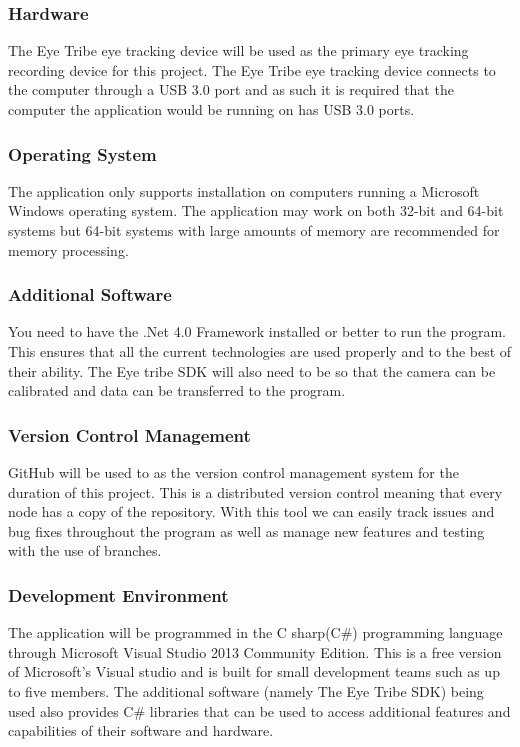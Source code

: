\subsubsection{Hardware}
The Eye Tribe eye tracking device will be used as the primary eye tracking recording device for this project. The Eye Tribe eye tracking device connects to the computer through a USB 3.0 port and as such it is required that the computer the application would be running on has USB 3.0 ports.

\subsubsection{Operating System}
The application only supports installation on computers running a Microsoft Windows operating system. The application may work on both 32-bit and 64-bit systems but 64-bit systems with large amounts of memory are recommended for memory processing. 

\subsubsection{Additional Software}
You need to have the .Net 4.0 Framework installed or better to run the program. This ensures that all the current technologies are used properly and to the best of their ability. The Eye tribe SDK will also need to be so that the camera can be calibrated and data can be transferred to the program.

\subsubsection{Version Control Management}
GitHub will be used to as the version control management system for the duration of this project.
This is a distributed version control meaning that every node has a copy of the repository. With this tool we can easily track issues and bug fixes throughout the program as well as manage new features and testing with the use of branches.

\subsubsection{Development Environment}
The application will be programmed in the C sharp(C\#) programming language through Microsoft Visual Studio 2013 Community Edition. This is a free version of Microsoft's Visual studio and is built for small development teams such as up to five members. The additional software (namely The Eye Tribe SDK) being used also provides C\# libraries that can be used to access additional features and capabilities of their software and hardware.
